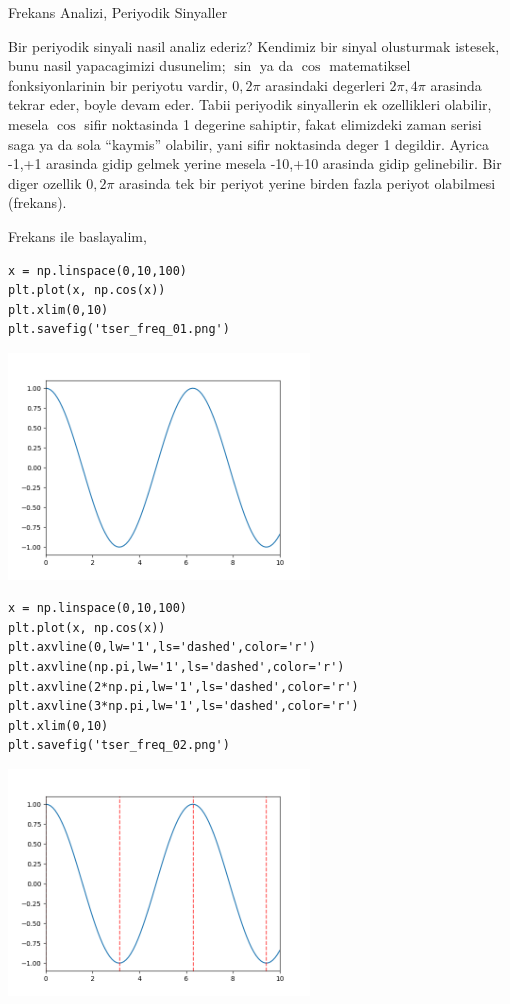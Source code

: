 \documentclass[12pt,fleqn]{article}\usepackage{../../common}
\begin{document}
Frekans Analizi, Periyodik Sinyaller

Bir periyodik sinyali nasil analiz ederiz? Kendimiz bir sinyal olusturmak
istesek, bunu nasil yapacagimizi dusunelim; $\sin$ ya da $\cos$
matematiksel fonksiyonlarinin bir periyotu vardir, $0,2\pi$ arasindaki
degerleri $2\pi,4\pi$ arasinda tekrar eder, boyle devam eder. Tabii
periyodik sinyallerin ek ozellikleri olabilir, mesela $\cos$ sifir
noktasinda 1 degerine sahiptir, fakat elimizdeki zaman serisi saga ya da
sola ``kaymis'' olabilir, yani sifir noktasinda deger 1 degildir. Ayrica
-1,+1 arasinda gidip gelmek yerine mesela -10,+10 arasinda gidip
gelinebilir. Bir diger ozellik $0,2\pi$ arasinda tek bir periyot yerine
birden fazla periyot olabilmesi (frekans). 

Frekans ile baslayalim, 

\begin{verbatim}
x = np.linspace(0,10,100)
plt.plot(x, np.cos(x))
plt.xlim(0,10)
plt.savefig('tser_freq_01.png')
\end{verbatim}

\includegraphics[height=6cm]{tser_freq_01.png}

\begin{verbatim}
x = np.linspace(0,10,100)
plt.plot(x, np.cos(x))
plt.axvline(0,lw='1',ls='dashed',color='r')
plt.axvline(np.pi,lw='1',ls='dashed',color='r')
plt.axvline(2*np.pi,lw='1',ls='dashed',color='r')
plt.axvline(3*np.pi,lw='1',ls='dashed',color='r')
plt.xlim(0,10)
plt.savefig('tser_freq_02.png')
\end{verbatim}

\includegraphics[height=6cm]{tser_freq_02.png}
\end{document}
